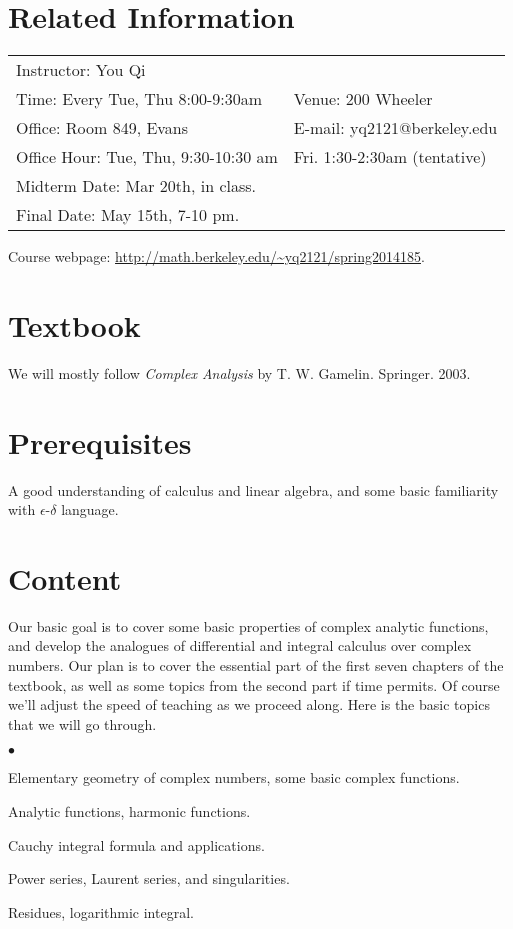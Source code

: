 \documentclass[margin,line]{res}
\newenvironment{list2}{
  \begin{list}{$\bullet$}{%
      \setlength{\itemsep}{0in}
      \setlength{\parsep}{0in} \setlength{\parskip}{0in}
      \setlength{\topsep}{0in} \setlength{\partopsep}{0in}
      \setlength{\leftmargin}{0.2in}}}{\end{list}}
\begin{document}

\begin{resume}

\section{\sc Related Information}
\vspace{.05in}
\begin{tabular}{@{}p{3.4in}p{4in}}
 Instructor: You Qi            &   \\
Time: Every Tue, Thu 8:00-9:30am & Venue: 200 Wheeler\\
Office: Room 849, Evans   & E-mail:  yq2121@berkeley.edu \\
Office Hour: Tue, Thu, 9:30-10:30 am & Fri. 1:30-2:30am (tentative)\\
Midterm Date: Mar 20th, in class. &\\
Final Date: May 15th, 7-10 pm.
\end{tabular}
Course webpage: \url{http://math.berkeley.edu/~yq2121/spring2014185}.

\section{\sc Textbook}
We will mostly follow \emph{Complex Analysis}
by T. W. Gamelin. Springer. 2003.

\section{\sc Prerequisites}
A good understanding of calculus and linear algebra, and some basic familiarity with $\epsilon$-$\delta$ language.


\section{\sc Content}
Our basic goal is to cover some basic properties of complex analytic functions, and develop the analogues of differential and integral calculus over complex numbers. Our plan is to cover the essential part of the first seven chapters of the textbook, as well as some topics from the second part if time permits. Of course we'll adjust the speed of teaching as we proceed along. Here is the basic topics that we will go through.
\begin{list2}
\item Elementary geometry of complex numbers, some basic complex functions.
\item Analytic functions, harmonic functions.
\item Cauchy integral formula and applications.
\item Power series, Laurent series, and singularities.
\item Residues, logarithmic integral.
\end{list2}


\end{resume}
\end{document}
